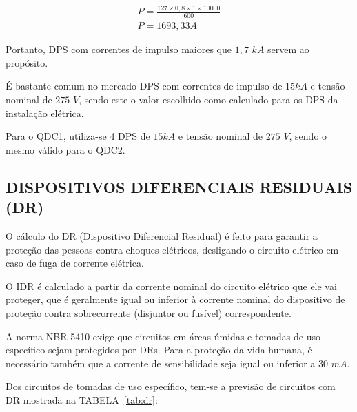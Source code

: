 \begin{equation}
	\begin{split}
		P = \frac{127 \times 0,8 \times 1 \times 10000}{600} \\
		P = 1693,33 A
	\end{split}
\end{equation}

Portanto, DPS com correntes de impulso maiores que $1,7$ $kA$ servem ao propósito.

É bastante comum no mercado DPS com correntes de impulso de $15kA$ e tensão nominal de $275$ $V$, sendo este o valor escolhido como calculado para os DPS da instalação elétrica.

Para o QDC1, utiliza-se 4 DPS de $15kA$ e tensão nominal de $275$ $V$, sendo o mesmo válido para o QDC2.

\subsection{DISPOSITIVOS DIFERENCIAIS RESIDUAIS (DR)}

O cálculo do DR (Dispositivo Diferencial Residual) é feito para garantir a proteção das pessoas contra choques elétricos, desligando o circuito elétrico em caso de fuga de corrente elétrica.

O IDR é calculado a partir da corrente nominal do circuito elétrico que ele vai proteger, que é geralmente igual ou inferior à corrente nominal do dispositivo de proteção contra sobrecorrente (disjuntor ou fusível) correspondente.

A norma NBR-5410 exige que circuitos em áreas úmidas e tomadas de uso específico sejam protegidos por DRs. Para a proteção da vida humana, é necessário também que a corrente de sensibilidade seja igual ou inferior a $30$ $mA$.


Dos circuitos de tomadas de uso específico, tem-se a previsão de circuitos com DR mostrada na TABELA~\ref{tab:dr}:

